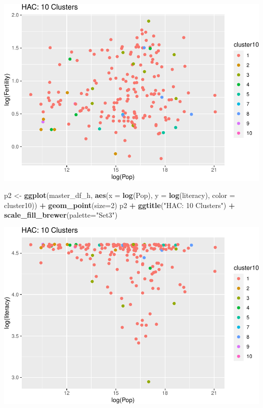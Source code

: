 \documentclass[]{article}
\newenvironment{Shaded}{\begin{snugshade}}{\end{snugshade}}
\newcommand{\DataTypeTok}[1]{\textcolor[rgb]{0.13,0.29,0.53}{#1}}
\newcommand{\DecValTok}[1]{\textcolor[rgb]{0.00,0.00,0.81}{#1}}
\newcommand{\KeywordTok}[1]{\textcolor[rgb]{0.13,0.29,0.53}{\textbf{#1}}}
\newcommand{\NormalTok}[1]{#1}
\newcommand{\OperatorTok}[1]{\textcolor[rgb]{0.81,0.36,0.00}{\textbf{#1}}}
\newcommand{\StringTok}[1]{\textcolor[rgb]{0.31,0.60,0.02}{#1}}
\begin{document}
\includegraphics{eda_files/figure-latex/unnamed-chunk-31-7.pdf}

\begin{Shaded}
\begin{Highlighting}[]
\NormalTok{p2 <-}\StringTok{ }\KeywordTok{ggplot}\NormalTok{(master_df_h, }\KeywordTok{aes}\NormalTok{(}\DataTypeTok{x =} \KeywordTok{log}\NormalTok{(Pop), }\DataTypeTok{y =} \KeywordTok{log}\NormalTok{(literacy), }\DataTypeTok{color =}\NormalTok{ cluster10)) }\OperatorTok{+}
\StringTok{  }\KeywordTok{geom_point}\NormalTok{(}\DataTypeTok{size=}\DecValTok{2}\NormalTok{)}
\NormalTok{p2 }\OperatorTok{+}\StringTok{ }\KeywordTok{ggtitle}\NormalTok{(}\StringTok{"HAC: 10 Clusters"}\NormalTok{) }\OperatorTok{+}\StringTok{ }\KeywordTok{scale_fill_brewer}\NormalTok{(}\DataTypeTok{palette=}\StringTok{"Set3"}\NormalTok{)}
\end{Highlighting}
\end{Shaded}

\includegraphics{eda_files/figure-latex/unnamed-chunk-31-8.pdf}
\end{document}
